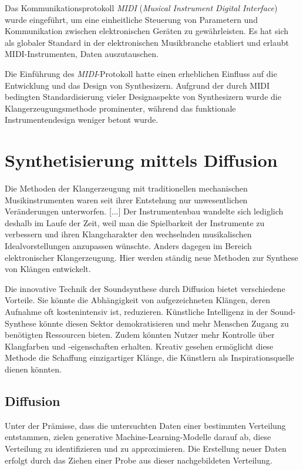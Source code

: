 \documentclass[
  a4paper,  %
  twoside,  %
  bibliography=totoc,
  headsepline,
  cleardoublepage=empty,
  parskip=half,
  draft=false
]{scrbook}
\begin{document}
Das Kommunikationsprotokoll \emph{MIDI} (\emph{Musical Instrument Digital Interface}) \cite{midi_association_midi_nodate} wurde eingeführt, um eine einheitliche Steuerung von Parametern und Kommunikation zwischen elektronischen Geräten zu gewährleisten. Es hat sich als globaler Standard in der elektronischen Musikbranche etabliert und erlaubt MIDI-Instrumenten, Daten auszutauschen. \cite{ruschkowski_elektronische_2019}

Die Einführung des \emph{MIDI}-Protokoll hatte einen erheblichen Einfluss auf die Entwicklung und das Design von Synthesizern. Aufgrund der durch MIDI bedingten Standardisierung vieler Designaspekte von Synthesizern wurde die Klangerzeugungsmethode prominenter, während das funktionale Instrumentendesign weniger betont wurde. \cite{russ_sound_2009}

\section{Synthetisierung mittels Diffusion}

\glqq Die Methoden der Klangerzeugung mit traditionellen mechanischen Musikinstrumenten waren seit ihrer Entstehung nur unwesentlichen Veränderungen unterworfen. [...] Der Instrumentenbau wandelte sich lediglich deshalb im Laufe der Zeit, weil man die Spielbarkeit der Instrumente zu verbessern und ihren Klangcharakter den wechselnden musikalischen Idealvorstellungen anzupassen wünschte. Anders dagegen im Bereich elektronischer Klangerzeugung. Hier werden ständig neue Methoden zur Synthese von Klängen entwickelt.\grqq \, \cite{ruschkowski_elektronische_2019}

Die innovative Technik der Soundsynthese durch Diffusion bietet verschiedene Vorteile. Sie könnte die Abhängigkeit von aufgezeichneten Klängen, deren Aufnahme oft kostenintensiv ist, reduzieren. Künstliche Intelligenz in der Sound-Synthese könnte diesen Sektor demokratisieren und mehr Menschen Zugang zu benötigten Ressourcen bieten. Zudem könnten Nutzer mehr Kontrolle über Klangfarben und -eigenschaften erhalten. Kreativ gesehen ermöglicht diese Methode die Schaffung einzigartiger Klänge, die Künstlern als Inspirationsquelle dienen könnten. \cite{haohe_liu_audioldm_2023}


\subsection{Diffusion}
Unter der Prämisse, dass die untersuchten Daten einer bestimmten Verteilung entstammen, zielen generative Machine-Learning-Modelle darauf ab, diese Verteilung zu identifizieren und zu approximieren. Die Erstellung neuer Daten erfolgt durch das Ziehen einer Probe aus dieser nachgebildeten Verteilung. \cite{machine_learning_at_berkeley_diffusion_2022}
\end{document}

